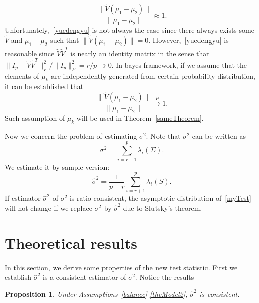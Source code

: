 \documentclass[review]{elsarticle}
\theoremstyle{plain}
\newtheorem{proposition}{\quad\quad Proposition}
\theoremstyle{definition}
\theoremstyle{remark}
\begin{document}
\begin{equation}\label{yuedengyu}
    \frac{\|\tilde{V}(\mu_1-\mu_2)\|}{\|\mu_1-\mu_2\|}\approx 1.
\end{equation}
Unfortunately,~\eqref{yuedengyu}
is not always the case since there always exists some
$\tilde{V}$ and $\mu_1-\mu_2$ such that $\|\tilde{V}(\mu_1-\mu_2)\|=0$.
However,~\eqref{yuedengyu} is reasonable since $\tilde{V}\tilde{V}^T$ is nearly an identity matrix in the sense that
    ${\|I_p-\tilde{V}\tilde{V}^T\|_F^2}/{\|I_p\|_F^2}=r/p\to 0$. 
In bayes framework, if we assume that the elements of $\mu_k$ are independently generated from certain probability distribution, it can be established that 
\begin{equation*}
    \frac{\|\tilde{V}(\mu_1-\mu_2)\|}{\|\mu_1-\mu_2\|}\xrightarrow{P}1.
\end{equation*}
Such assumption of $\mu_k$ will be used in Theorem~\ref{sameTheorem}.


Now we concern the problem of estimating $\sigma^2$.  Note that $\sigma^2$ can be written as
\begin{equation}\label{jjjVariance}
    \sigma^2=\sum_{i=r+1}^{p}\lambda_i(\Sigma).
\end{equation}
We estimate it by sample version:
\begin{equation*}
    \hat{\sigma}^2=\frac{1}{p-r}\sum_{i=r+1}^{p} \lambda_i(S).
\end{equation*}
If estimator $\hat{\sigma}^2$ of $\sigma^2$ is ratio consistent, the asymptotic distribution of~\eqref{myTest} will not change if we replace $\sigma^2$ by $\hat{\sigma}^2$  due to Slutsky's theorem.




\section{Theoretical results}

In this section, we derive some properties of the new test statistic.
First we establish $\hat{\sigma}^2$ is a consistent estimator of $\sigma^2$. Notice the results  
\begin{proposition}\label{varianceEstimation}
    Under Assumptions~\ref{balance}-\ref{theModel2},      $\hat{\sigma}^2$ is consistent.
\end{proposition}
\end{document}
